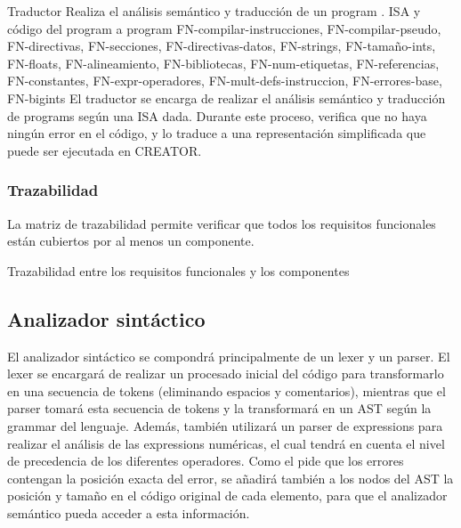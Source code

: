 \begin{component}{Traductor}
    {Realiza el análisis semántico y traducción de un \gls{program} .} %
    {\NA} %
    {\gls{ISA} y código del \gls{program} a } %
    {\Gls{program} } %
    {FN-compilar-instrucciones, FN-compilar-pseudo, FN-directivas,
    FN-secciones, FN-directivas-datos, FN-strings, FN-tamaño-ints,
    FN-floats, FN-alineamiento, FN-bibliotecas, FN-num-etiquetas,
    FN-referencias, FN-constantes, FN-expr-operadores,
    FN-mult-defs-instruccion, FN-errores-base, FN-bigints} %
    El traductor se encarga de realizar el análisis semántico y traducción
    de \glspl{program}  según una \gls{ISA} dada.
    Durante este proceso, verifica que no haya ningún error en el código, y lo
    traduce a una representación simplificada que puede ser ejecutada en
    CREATOR.
\end{component}

\let\componentref\undefined

\FloatBarrier

\subsubsection{Trazabilidad}

La matriz de trazabilidad permite verificar que todos los requisitos funcionales
están cubiertos por al menos un componente.

\begin{landscape}
        {Trazabilidad entre los requisitos funcionales y los componentes}
\end{landscape}

\FloatBarrier

\subsection{Analizador sintáctico}

El analizador sintáctico se compondrá principalmente de un \gls{lexer} y un
\gls{parser}. El \gls{lexer} se encargará de realizar un procesado inicial del
código para transformarlo en una secuencia de \glspl{token} (eliminando espacios
y comentarios), mientras que el \gls{parser} tomará esta secuencia de
\glspl{token} y la transformará en un \gls{AST} según la \gls{grammar} del
lenguaje. Además, también utilizará un \gls{parser} de \glspl{expression} para
realizar el análisis de las \glspl{expression} numéricas, el cual tendrá en
cuenta el nivel de precedencia de los diferentes operadores. Como el
 pide que los errores contengan la posición exacta del
error, se añadirá también a los nodos del \gls{AST} la posición y tamaño en el
código original de cada elemento, para que el analizador semántico pueda acceder
a esta información.

